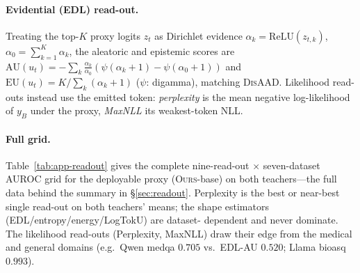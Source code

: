 \documentclass[11pt]{article}
\newcommand{\ours}{\textsc{Ours}}
\newcommand{\disaad}{\textsc{DisAAD}}
\begin{document}
\paragraph{Evidential (EDL) read-out.} Treating the top-$K$ proxy logits $z_t$ as Dirichlet
evidence $\alpha_k=\mathrm{ReLU}(z_{t,k})$, $\alpha_0=\sum_{k=1}^K\alpha_k$, the aleatoric and
epistemic scores are $\mathrm{AU}(u_t)=-\sum_k\frac{\alpha_k}{\alpha_0}(\psi(\alpha_k{+}1)-
\psi(\alpha_0{+}1))$ and $\mathrm{EU}(u_t)=K/\sum_k(\alpha_k{+}1)$ ($\psi$: digamma), matching
\disaad. Likelihood read-outs instead use the emitted token: \emph{perplexity} is the mean
negative log-likelihood of $y_B$ under the proxy, \emph{MaxNLL} its weakest-token NLL.

\paragraph{Full grid.} Table~\ref{tab:app-readout} gives the complete nine-read-out $\times$ seven-dataset AUROC
grid for the deployable proxy (\ours-base) on both teachers---the full data behind the
summary in \S\ref{sec:readout}. Perplexity is the best or near-best single read-out on
both teachers' means; the shape estimators (EDL/entropy/energy/LogTokU) are dataset-%
dependent and never dominate. The likelihood read-outs (Perplexity, MaxNLL) draw their
edge from the medical and general domains (e.g.\ Qwen medqa $0.705$ vs.\ EDL-AU $0.520$;
Llama bioasq $0.993$).
\end{document}
